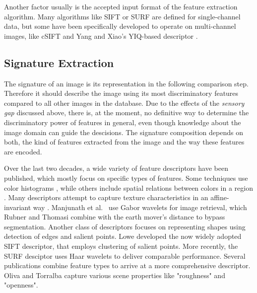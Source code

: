 Another factor usually is the accepted input format of the feature extraction
algorithm. Many algorithms like SIFT \autocite{lowe_object_1999} or SURF
\autocite{bay_speeded-up_2008} are defined for single-channel data, but some
have been specifically developed to operate on multi-channel images, like cSIFT
\autocite{abdel-hakim_csift:_2006} and Yang and Xiao's YIQ-based descriptor
\autocite{yang_robust_2008}.

\subsection{Signature Extraction}\label{sec:anatomy_signature_extraction}

The signature of an image is its representation in the following comparison
step. Therefore it should describe the image using its most discriminatory
features compared to all other images in the database. Due to the effects of
the \emph{sensory gap} discussed above, there is, at the moment, no definitive
way to determine the discriminatory power of features in general, even though
knowledge about the image domain can guide the descisions.  The signature
composition depends on both, the kind of features extracted from the image and
the way these features are encoded. 

Over the last two decades, a wide variety of feature descriptors have been
published, which mostly focus on specific types of features. Some techniques
use color histograms \autocite{utenpattanant_color_2006}, while others include
spatial relations between colors in a region \autocite{stricker_color_1996}
\autocite{deng_efficient_2001} \autocite{lee_spatial_2003}.
Many descriptors attempt to capture texture characteristics in an
affine-invariant way \autocite{schaffalitzky_viewpoint_2001}. Manjunath et al.\
\autocite{manjunath_texture_1996} use Gabor wavelets for image retrieval, which
Rubner and Thomasi \autocite{rubner_texture-based_1999} combine with the earth
mover's distance to bypass segmentation.
Another class of descriptors focuses on representing shapes using detection of
edges and salient points. Lowe \autocite{lowe_object_1999} developed the now
widely adopted SIFT descriptor, that employs clustering of salient points. More
recently, the SURF desciptor \autocite{bay_speeded-up_2008} uses Haar wavelets
to deliver comparable performance.
Several publications combine feature types to arrive at a more comprehensive
descriptor. Oliva and Torralba \autocite{oliva_modeling_2001} capture various
scene properties like "roughness" and "openness".

